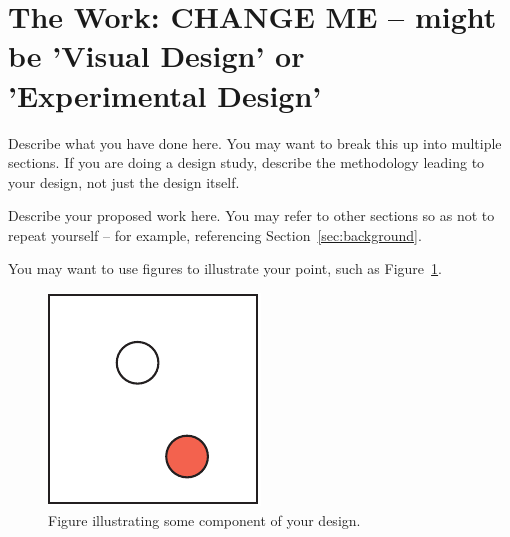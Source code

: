 \section{The Work: CHANGE ME -- might be 'Visual Design' or 'Experimental
Design'} %
\label{sec:vis}

Describe what you have done here. You may want to break this up into multiple
sections. If you are doing a design study, describe the methodology leading to
your design, not just the design itself.

Describe your proposed work here. You may refer to other sections so as not to
repeat yourself -- for example, referencing Section~\ref{sec:background}.

You may want to use figures to illustrate your point, such as
Figure~\ref{fig:sample}.

\begin{figure}[h]
 \centering %
 \includegraphics[width=\columnwidth]{figs/sample} 
 \caption{Figure illustrating some component of your design.}
 \label{fig:sample}
\end{figure}


